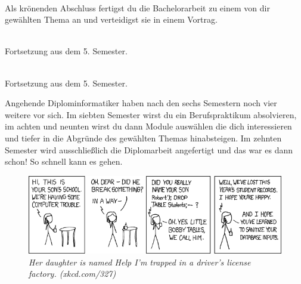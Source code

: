 \textbf{} \\
Als krönenden Abschluss fertigst du die Bachelorarbeit zu einem von dir gewählten Thema an und verteidigst sie in einem Vortrag.

\textbf{} \\
Fortsetzung aus dem 5. Semester.

\textbf{} \\
Fortsetzung aus dem 5. Semester.


Angehende Diplominformatiker haben nach den sechs Semestern noch vier weitere vor sich.
Im siebten Semester wirst du ein Berufspraktikum absolvieren, im achten und neunten wirst du dann Module auswählen die dich interessieren und tiefer in die Abgründe des gewählten Themas hinabsteigen.
Im zehnten Semester wird ausschließlich die Diplomarbeit angefertigt und das war es dann schon!
So schnell kann es gehen.

\vfill

\begin{figure}[h!]
\centering
\includegraphics[scale=.5]{img/xkcd/exploits_of_a_mom.png}
\caption*{{\small \textit{Her daughter is named Help I'm trapped in a driver's license factory. (xkcd.com/327)}}}
\end{figure}
